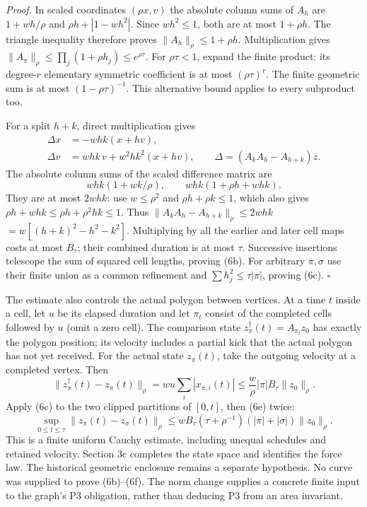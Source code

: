 \documentclass[11pt,a4paper]{article}
\begin{document}
\emph{Proof.} In scaled coordinates \((\rho x,v)\) the absolute column
sums of \(A_h\) are \(1+wh/\rho\) and \(\rho h+|1-wh^2|\). Since
\(wh^2\le1\), both are at most \(1+\rho h\). The triangle inequality
therefore proves \(\|A_h\|_\rho\le1+\rho h\). Multiplication gives
\(\|A_\pi\|_\rho\le\prod_j(1+\rho h_j)\le e^{\rho\tau}\). For
\(\rho\tau<1\), expand the finite product: its degree-\(r\) elementary
symmetric coefficient is at most \((\rho\tau)^r\). The finite geometric
sum is at most \((1-\rho\tau)^{-1}\). This alternative bound applies to
every subproduct too.

For a split \(h+k\), direct multiplication gives \[\begin{aligned}
\Delta x&=-whk(x+hv),\\
\Delta v&=whk\,v+w^2hk^2(x+hv),
\qquad\Delta=(A_kA_h-A_{h+k})z.
\end{aligned}\tag{6d}\] The absolute column sums of the scaled
difference matrix are \[whk(1+wk/\rho),\qquad whk(1+\rho h+whk).\] They
are at most \(2whk\): use \(w\le\rho^2\) and \(\rho h+\rho k\le1\),
which also gives \(\rho h+whk\le\rho h+\rho^2hk\le1\). Thus
\(\|A_kA_h-A_{h+k}\|_\rho\le2whk\) \(=w[(h+k)^2-h^2-k^2]\). Multiplying
by all the earlier and later cell maps costs at most \(B_\tau\); their
combined duration is at most \(\tau\). Successive insertions telescope
the sum of squared cell lengths, proving (6b). For arbitrary
\(\pi,\sigma\) use their finite union as a common refinement and
\(\sum h_j^2\le\tau|\pi|\), proving (6c). \(\square\)

The estimate also controls the actual polygon between vertices. At a
time \(t\) inside a cell, let \(u\) be its elapsed duration and let
\(\pi_t\) consist of the completed cells followed by \(u\) (omit a zero
cell). The comparison state \(z_\pi^\dagger(t)=A_{\pi_t}z_0\) has
exactly the polygon position; its velocity includes a partial kick that
the actual polygon has not yet received. For the actual state
\(z_\pi(t)\), take the outgoing velocity at a completed vertex. Then
\[\|z_\pi^\dagger(t)-z_\pi(t)\|_\rho
=wu\sum_i|x_{\pi,i}(t)|
\le\frac{w}{\rho}|\pi|B_\tau\|z_0\|_\rho.
\tag{6e}\] Apply (6c) to the two clipped partitions of \([0,t]\), then
(6e) twice: \[\sup_{0\le t\le\tau}\|z_\pi(t)-z_\sigma(t)\|_\rho
\le wB_\tau(\tau+\rho^{-1})(|\pi|+|\sigma|)\|z_0\|_\rho.
\tag{6f}\] This is a finite uniform Cauchy estimate, including unequal
schedules and retained velocity. Section 3c completes the state space
and identifies the force law. The historical geometric enclosure remains
a separate hypothesis. No curve was supplied to prove (6b)--(6f). The
norm change supplies a concrete finite input to the graph's P3
obligation, rather than deducing P3 from an area invariant.
\end{document}
